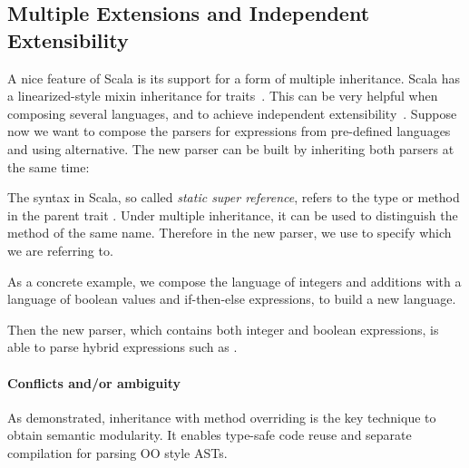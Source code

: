 \subsection{Multiple Extensions and Independent Extensibility}
A nice feature of Scala is its support for a form of multiple
inheritance.  Scala has a linearized-style mixin inheritance for
traits~\cite{odersky2004overview}. This can be very helpful when
composing several languages, and to achieve independent
extensibility~\cite{odersky2005independently}. 
Suppose now we want to compose the parsers for expressions
from pre-defined languages  and
 using alternative. The new parser can be built
by inheriting both parsers at the same time:


The  syntax in Scala, so called \textit{static super reference}, refers to the type or method  in the parent trait . Under multiple inheritance, it can be used to distinguish the method of the same name. Therefore in the new parser, we use  to specify which  we are referring to.

As a concrete example, we compose the language of integers and additions with a language of boolean values and if-then-else expressions, to build a new language.


\begin{comment}
\bruno{You can present the abstract example, as you do
  here, but you should also present a concrete example. You
already have Var, maybe you can add another language extension for
boolean literals. Show the code for the boolean literals parsing as
well as the composition code.}

Interestingly note that, due to the use of multiple inheritance, we
need two different super calls.\bruno{expand here. People may not
be familiar with scala super calls, you have to explain what the
syntax does.}
\end{comment}

Then the new parser, which contains both integer and boolean
expressions, is able to parse hybrid expressions such as
.

\paragraph{Conflicts and/or ambiguity}

As demonstrated, inheritance with method overriding is the key
technique to obtain semantic modularity.  It enables type-safe code
reuse and separate compilation for parsing OO style ASTs.
